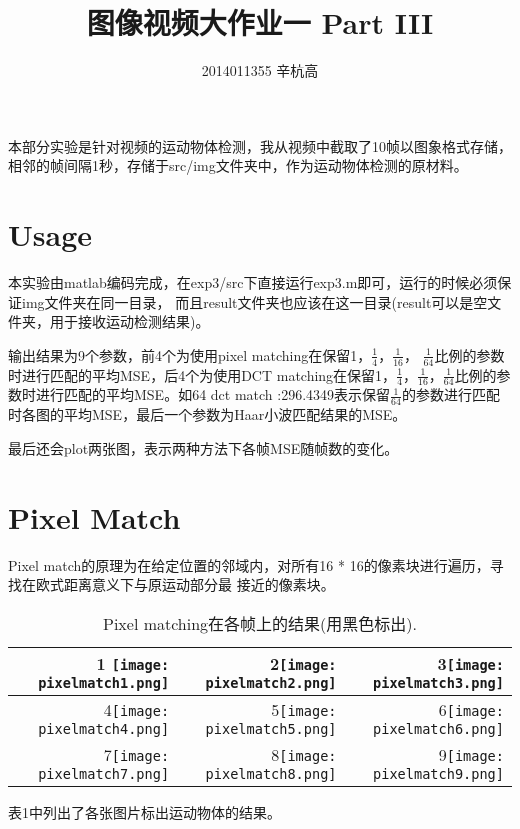 \documentclass{ctexart}
\author{2014011355 辛杭高}
\title{图像视频大作业一 Part III}
\begin{document}
\maketitle
本部分实验是针对视频的运动物体检测，我从视频中截取了10帧以图象格式存储，相邻的帧间隔1秒，存储于src/img文件夹中，作为运动物体检测的原材料。

\section{Usage}
本实验由matlab编码完成，在exp3/src下直接运行exp3.m即可，运行的时候必须保证img文件夹在同一目录，
而且result文件夹也应该在这一目录(result可以是空文件夹，用于接收运动检测结果)。

输出结果为9个参数，前4个为使用pixel matching在保留1，$\frac{1}{4}$，$\frac{1}{16}$，
$\frac{1}{64}$比例的参数时进行匹配的平均MSE，后4个为使用DCT matching在保留1，$\frac{1}{4}$，$\frac{1}{16}$，$\frac{1}{64}$比例的参数时进行匹配的平均MSE。如64 dct match :296.4349表示保留$\frac{1}{64}$的参数进行匹配时各图的平均MSE，最后一个参数为Haar小波匹配结果的MSE。

最后还会plot两张图，表示两种方法下各帧MSE随帧数的变化。

\section{Pixel Match}
Pixel match的原理为在给定位置的邻域内，对所有16 * 16的像素块进行遍历，寻找在欧式距离意义下与原运动部分最
接近的像素块。

\begin{table}
\Large 
\begin{tabular}{|r|r|r|}
\hline

1 \texttt{[image: pixelmatch1.png]} & 2\texttt{[image: pixelmatch2.png]} & 3\texttt{[image: pixelmatch3.png]} \\ \hline

4\texttt{[image: pixelmatch4.png]} & 5\texttt{[image: pixelmatch5.png]} & 6\texttt{[image: pixelmatch6.png]} \\ \hline

7\texttt{[image: pixelmatch7.png]} & 8\texttt{[image: pixelmatch8.png]} & 9\texttt{[image: pixelmatch9.png]} \\ \hline

\end{tabular}
\caption{Pixel matching在各帧上的结果(用黑色标出).}
\end{table}
表1中列出了各张图片标出运动物体的结果。
\end{document}
